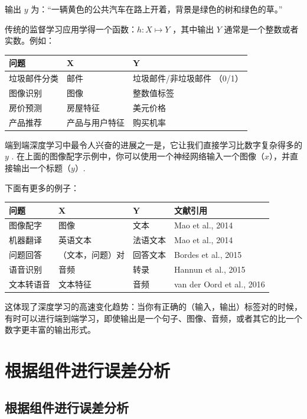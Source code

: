 输出 \(y\)
为：``一辆黄色的公共汽车在路上开着，背景是绿色的树和绿色的草。''

传统的监督学习应用学得一个函数：\(h:X \mapsto Y\) ，其中输出 \(Y\)
通常是一个整数或者实数。例如：

\begin{longtable}[]{@{}lll@{}}
\toprule
问题 & X & Y \\
\midrule
\endhead
垃圾邮件分类 & 邮件 & 垃圾邮件/非垃圾邮件 （0/1） \\
图像识别 & 图像 & 整数值标签 \\
房价预测 & 房屋特征 & 美元价格 \\
产品推荐 & 产品与用户特征 & 购买机率 \\
\bottomrule
\end{longtable}

端到端深度学习中最令人兴奋的进展之一是，它让我们直接学习比数字复杂得多的
\(y\) .
在上面的图像配字示例中，你可以使用一个神经网络输入一个图像（\(x\)），并直接输出一个标题（\(y\)）.

下面有更多的例子：

\begin{longtable}[]{@{}llll@{}}
\toprule
问题 & X & Y & 文献引用 \\
\midrule
\endhead
图像配字 & 图像 & 文本 & Mao et al., 2014 \\
机器翻译 & 英语文本 & 法语文本 & Mao et al., 2014 \\
问题回答 & （文本，问题）对 & 回答文本 & Bordes et al., 2015 \\
语音识别 & 音频 & 转录 & Hannun et al., 2015 \\
文本转语音 & 文本特征 & 音频 & van der Oord et al., 2016 \\
\bottomrule
\end{longtable}

这体现了深度学习的高速变化趋势：当你有正确的（输入，输出）标签对的时候，有时可以进行端到端学习，即使输出是一个句子、图像、音频，或者其它的比一个数字更丰富的输出形式。

\hypertarget{ux6839ux636eux7ec4ux4ef6ux8fdbux884cux8befux5deeux5206ux6790}{%
\part{根据组件进行误差分析}\label{ux6839ux636eux7ec4ux4ef6ux8fdbux884cux8befux5deeux5206ux6790}}

\hypertarget{ux6839ux636eux7ec4ux4ef6ux8fdbux884cux8befux5deeux5206ux6790-1}{%
\chapter{根据组件进行误差分析}\label{ux6839ux636eux7ec4ux4ef6ux8fdbux884cux8befux5deeux5206ux6790-1}}

